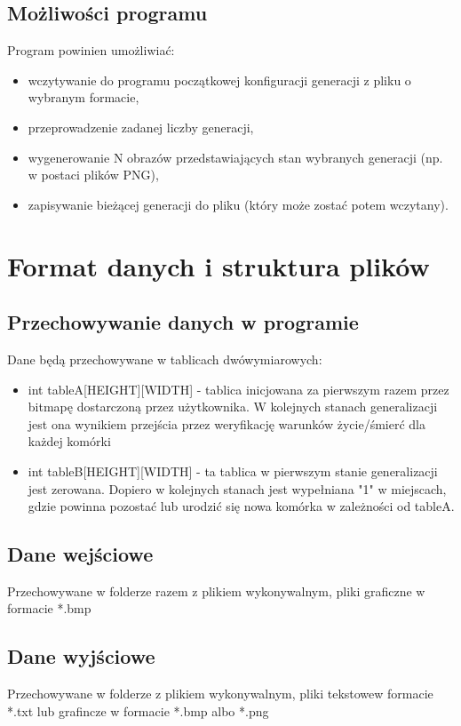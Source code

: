 \documentclass[12pt, letterpaper, ]{article}
\begin{document}
	\subsection{Możliwości programu}
	Program powinien umożliwiać:
	\begin{itemize}
		\item wczytywanie do programu początkowej konfiguracji generacji z pliku o wybranym formacie,
		\item przeprowadzenie zadanej liczby generacji,
		\item wygenerowanie N obrazów przedstawiających stan wybranych generacji (np. w postaci plików PNG),
		\item zapisywanie bieżącej generacji do pliku (który może zostać potem wczytany).
	\end{itemize}	
	\section[Format danych i struktura plików]{Format danych i struktura plików}
	\subsection{Przechowywanie danych w programie}
	Dane będą przechowywane w tablicach dwówymiarowych:
	\begin{itemize}
		\item int tableA[HEIGHT][WIDTH] - tablica inicjowana za pierwszym razem przez bitmapę dostarczoną przez użytkownika. W kolejnych stanach generalizacji jest ona wynikiem przejścia przez weryfikację warunków życie/śmierć dla każdej komórki
		\item int tableB[HEIGHT][WIDTH] - ta tablica w pierwszym stanie generalizacji jest zerowana. Dopiero w kolejnych stanach jest wypełniana "1" w miejscach, gdzie powinna pozostać lub urodzić się nowa komórka w zależności od tableA.
	\end{itemize}
	\subsection{Dane wejściowe}
	Przechowywane w folderze razem z plikiem wykonywalnym, pliki graficzne
	w formacie *.bmp
	\subsection{Dane wyjściowe}
	Przechowywane w folderze z plikiem wykonywalnym, pliki tekstowew formacie *.txt lub grafincze w formacie *.bmp albo *.png
	
\end{document}
